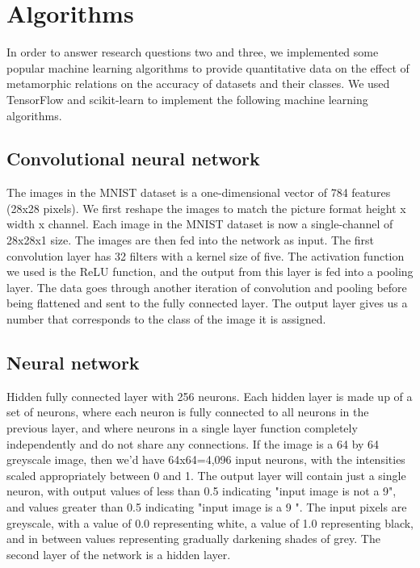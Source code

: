 \section{Algorithms}\label{Algorithms}
In order to answer research questions two and three, we implemented some popular machine learning algorithms to provide quantitative data on the effect of metamorphic relations on the accuracy of datasets and their classes. We used TensorFlow and scikit-learn to implement the following machine learning algorithms.

\subsection{Convolutional neural network}
The images in the MNIST dataset is a one-dimensional vector of 784 features (28x28 pixels). We first reshape the images to match the picture format height x width x channel. Each image in the MNIST dataset is now a single-channel of 28x28x1 size. The images are then fed into the network as input. The first convolution layer has 32 filters with a kernel size of five. The activation function we used is the ReLU function, and the output from this layer is fed into a pooling layer. The data goes through another iteration of convolution and pooling before being flattened and sent to the fully connected layer. The output layer gives us a number that corresponds to the class of the image it is assigned.

\subsection{Neural network}



 Hidden fully connected layer with 256 neurons. Each hidden layer is made up of a set of neurons, where each neuron is fully connected to all neurons in the previous layer, and where neurons in a single layer function completely independently and do not share any connections. If the image is a 64 by 64 greyscale image, then we'd have 64x64=4,096 input neurons, with the intensities scaled appropriately between 0 and 1. The output layer will contain just a single neuron, with output values of less than 0.5 indicating "input image is not a 9", and values greater than 0.5 indicating "input image is a 9 ". The input pixels are greyscale, with a value of 0.0 representing white, a value of 1.0 representing black, and in between values representing gradually darkening shades of grey. The second layer of the network is a hidden layer.


